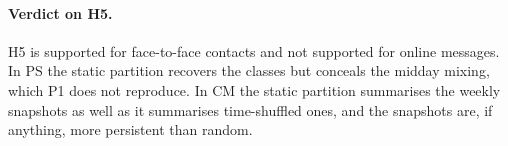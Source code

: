 \paragraph{Verdict on H5.}
H5 is supported for face-to-face contacts and not supported for online messages. In PS the
static partition recovers the classes but conceals the midday mixing, which P1 does not
reproduce. In CM the static partition summarises the weekly snapshots as well as it
summarises time-shuffled ones, and the snapshots are, if anything, more persistent than
random.
